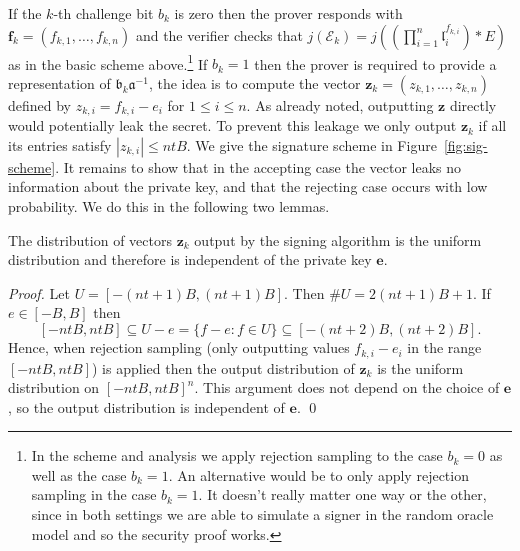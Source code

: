 \documentclass{llncs}
\newcommand{\E}{\mathcal{E}}
\renewcommand{\a}{\mathfrak{a}}
\renewcommand{\b}{\mathfrak{b}}
\renewcommand{\l}{\mathfrak{l}}
\newcommand{\e}{\mathbf{e}}
\newcommand{\f}{\mathbf{f}}
\newcommand{\z}{\mathbf{z}}
\begin{document}
If the $k$-th challenge bit $b_k$ is zero then the prover responds with $\f_k = ( f_{k,1}, \dots, f_{k,n} )$ and the verifier checks that $j(\E_k) = j( (\prod_{i=1}^n \l_i^{f_{k,i}}) * E )$ as in the basic scheme above.\footnote{In the scheme and analysis we apply rejection sampling to the case $b_k = 0$ as well as the case $b_k = 1$. An alternative would be to only apply rejection sampling in the case $b_k = 1$. It doesn't really matter one way or the other, since in both settings we are able to simulate a signer in the random oracle model and so the security proof works.}
If $b_k = 1$ then the prover is required to provide a representation of $\b_k \a^{-1}$, the idea is to compute the vector $\z_k = (z_{k,1}, \dots, z_{k,n}) $ defined by $z_{k,i} = f_{k,i} - e_i $ for $1 \le i \le n$.
As already noted, outputting $\z$ directly would potentially leak the secret.
To prevent this leakage we only output $\z_k$ if all its entries satisfy $| z_{k,i} | \le nt B$.
We give the signature scheme in Figure~\ref{fig:sig-scheme}.
It remains to show that in the accepting case the vector leaks no information about the private key, and that the rejecting case occurs with low probability. We do this in the following two lemmas.

\begin{lemma} \label{lem:sim2}
The distribution of vectors $\z_k$ output by the signing algorithm is the uniform distribution and therefore is independent of the private key $\e$.
\end{lemma}

\begin{proof}
Let $U = [-(nt+1)B, (nt+1)B]$. Then $\#U = 2(nt + 1)B + 1$.
If $e \in [-B, B]$ then 
\[
    [-ntB, ntB] \subseteq  U - e = \{ f - e : f \in U \} \subseteq [-(nt+2)B, (nt+2)B ].
\]
Hence, when rejection sampling (only outputting values $f_{k,i} - e_i$ in the range $[-ntB, ntB]$) is applied then the output distribution of $\z_k$ is the uniform distribution on $[-ntB, ntB]^n$.
This argument does not depend on the choice of $\e$, so the output distribution is independent of $\e$. \qed
\end{proof}
\end{document}
